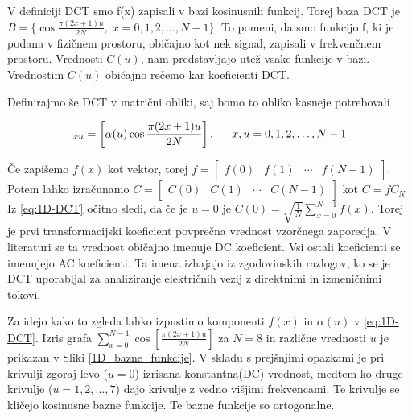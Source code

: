\documentclass[a4paper,12pt,openright]{book}
\begin{document}
V definiciji DCT smo f(x) zapisali v bazi kosinusnih funkcij. Torej baza DCT je $B = \{\cos\frac{\pi(2x+1)u}{2N}, \; x = 0,1,2,\ldots,N-1 \}$. To pomeni, da smo funkcijo f, ki je podana v fizičnem prostoru, običajno kot nek signal, zapisali v frekvenčnem prostoru. Vrednosti $C(u)$, nam predstavljajo utež vsake funkcije v bazi. Vrednostim $C(u)$ običajno rečemo kar koeficienti DCT.

Definirajmo še DCT v matrični obliki, saj bomo to obliko kasneje potrebovali

\begin{equation}
[C_N]_{xu} = \left[\alpha(u) \cos\frac{\pi(2x+1)u}{2N}\right], \indent 
x,u = 0,1,2,\ldots,N-1
\label{eq:1D_DCT_matrika}
\end{equation}

Če zapišemo $f(x)$ kot vektor, torej \(f = 
\begin{bmatrix} 
f(0) & f(1) & \cdots & f(N-1)
\end{bmatrix}.
\)
Potem lahko izračunamo \(C =  
\begin{bmatrix} 
C(0) & C(1) & \cdots & C(N-1)
\end{bmatrix}
\)
kot $C = fC_N$
Iz \ref{eq:1D-DCT} očitno sledi, da če je $u = 0$ je 
$C(0) = \sqrt{\frac{1}{N}} \sum_{x=0}^{N-1} f(x)$. Torej je prvi transformacijski koeficient povprečna vrednost vzorčnega zaporedja. V literaturi se ta vrednost običajno imenuje DC koeficient. Vsi ostali koeficienti se imenujejo AC koeficienti. Ta imena izhajajo iz zgodovinskih razlogov, ko se je DCT uporabljal za analiziranje električnih vezij z direktnimi in izmeničnimi tokovi. \par
Za idejo kako to zgleda lahko izpustimo komponenti $f(x)$ in $\alpha(u)$ v \ref{eq:1D-DCT}. Izris grafa  $\sum_{x=0}^{N-1}\cos[\frac{\pi(2x+1)u}{2N}]$ za $N=8$ in različne vrednosti $u$ je prikazan v Sliki \ref{1D_bazne_funkcije}. V skladu s prejšnjimi opazkami je pri krivulji zgoraj levo ($u=0$) izrisana konstantna(DC) vrednost, medtem ko druge krivulje ($u=1,2,\ldots,7$) dajo krivulje z vedno višjimi frekvencami. Te krivulje se kličejo kosinusne bazne funkcije. Te bazne funkcije so ortogonalne. 
\end{document}
